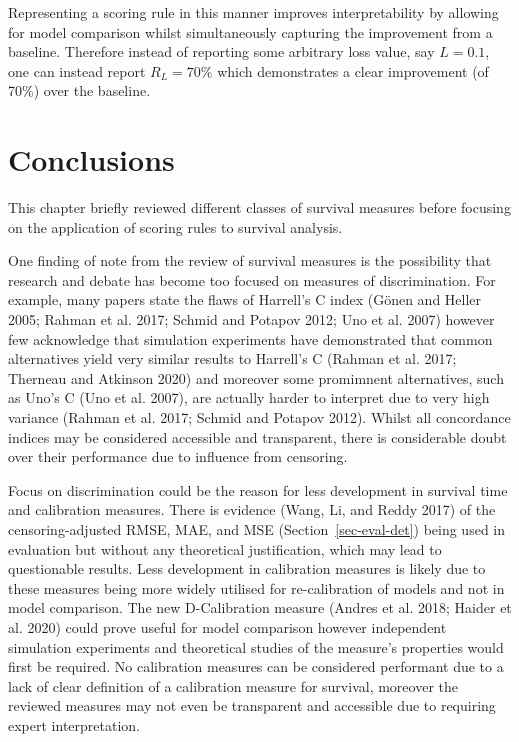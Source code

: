 \documentclass[
  letterpaper,
]{scrbook}
\theoremstyle{plain}
\theoremstyle{definition}
\theoremstyle{remark}
\begin{document}
Representing a scoring rule in this manner improves interpretability by
allowing for model comparison whilst simultaneously capturing the
improvement from a baseline. Therefore instead of reporting some
arbitrary loss value, say \(L = 0.1\), one can instead report
\(R_L = 70\%\) which demonstrates a clear improvement (of 70\%) over the
baseline.

\hypertarget{sec-eval-conc}{%
\section{Conclusions}\label{sec-eval-conc}}

This chapter briefly reviewed different classes of survival measures
before focusing on the application of scoring rules to survival
analysis.

One finding of note from the review of survival measures is the
possibility that research and debate has become too focused on measures
of discrimination. For example, many papers state the flaws of Harrell's
C index (Gönen and Heller 2005; Rahman et al. 2017; Schmid and Potapov
2012; Uno et al. 2007) however few acknowledge that simulation
experiments have demonstrated that common alternatives yield very
similar results to Harrell's C (Rahman et al. 2017; Therneau and
Atkinson 2020) and moreover some promimnent alternatives, such as Uno's
C (Uno et al. 2007), are actually harder to interpret due to very high
variance (Rahman et al. 2017; Schmid and Potapov 2012). Whilst all
concordance indices may be considered accessible and transparent, there
is considerable doubt over their performance due to influence from
censoring.

Focus on discrimination could be the reason for less development in
survival time and calibration measures. There is evidence (Wang, Li, and
Reddy 2017) of the censoring-adjusted RMSE, MAE, and MSE
(Section~\ref{sec-eval-det}) being used in evaluation but without any
theoretical justification, which may lead to questionable results. Less
development in calibration measures is likely due to these measures
being more widely utilised for re-calibration of models and not in model
comparison. The new D-Calibration measure (Andres et al. 2018; Haider et
al. 2020) could prove useful for model comparison however independent
simulation experiments and theoretical studies of the measure's
properties would first be required. No calibration measures can be
considered performant due to a lack of clear definition of a calibration
measure for survival, moreover the reviewed measures may not even be
transparent and accessible due to requiring expert interpretation.
\end{document}
